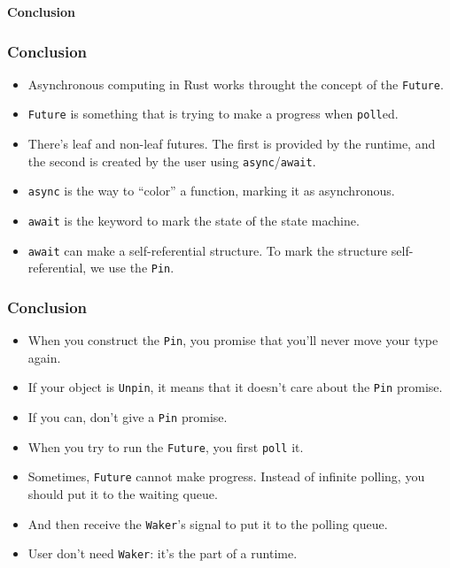 \documentclass[aspectratio=1610,t]{beamer}
\begin{document}

\begin{frame}[c]
\centering\Huge\textbf{Conclusion}
\end{frame}


\begin{frame}[fragile]
\frametitle{Conclusion}
\begin{itemize}
    \item<1-> Asynchronous computing in Rust works throught the concept of the \texttt{Future}.
    \item<2-> \texttt{Future} is something that is trying to make a progress when \texttt{poll}ed.
    \item<3-> There's leaf and non-leaf futures. The first is provided by the runtime, and the second is created by the user using \texttt{async}/\texttt{await}.
    \item<4-> \texttt{async} is the way to ``color'' a function, marking it as asynchronous.
    \item<5-> \texttt{await} is the keyword to mark the state of the state machine.
    \item<6-> \texttt{await} can make a self-referential structure. To mark the structure self-referential, we use the \texttt{Pin}.
\end{itemize}
\end{frame}


\begin{frame}[fragile]
\frametitle{Conclusion}
\begin{itemize}
    \item<1-> When you construct the \texttt{Pin}, you promise that you'll never move your type again.
    \item<2-> If your object is \texttt{Unpin}, it means that it doesn't care about the \texttt{Pin} promise.
    \item<3-> If you can, don't give a \texttt{Pin} promise.
    \item<4-> When you try to run the \texttt{Future}, you first \texttt{poll} it.
    \item<5-> Sometimes, \texttt{Future} cannot make progress. Instead of infinite polling, you should put it to the waiting queue.
    \item<6-> And then receive the \texttt{Waker}'s signal to put it to the polling queue.
    \item<7-> User don't need \texttt{Waker}: it's the part of a runtime.
\end{itemize}
\end{frame}
\end{document}
